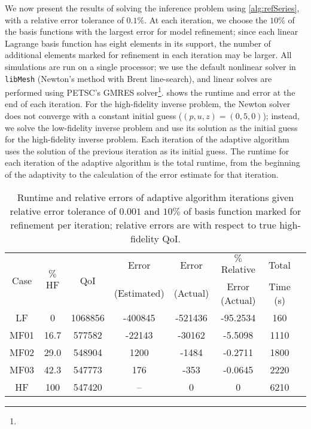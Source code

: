 We now present the results of solving the inference problem using \cref{alg:refSeries}, with a relative error tolerance of $0.1\%$. At each iteration, we choose the $10\%$ of the basis functions with the largest error for model refinement; since each linear Lagrange basis function has eight elements in its support, the number of additional elements marked for refinement in each iteration may be larger. All simulations are run on a single processor; we use the default nonlinear solver in \texttt{libMesh} (Newton's method with Brent line-search), and linear solves are performed using PETSC's GMRES solver\footnote{}.  shows the runtime and error at the end of each iteration. For the high-fidelity inverse problem, the Newton solver does not converge with a constant initial guess ($(p,u,z)=(0,5,0)$); instead, we solve the low-fidelity inverse problem and use its solution as the initial guess for the high-fidelity inverse problem. Each iteration of the adaptive algorithm uses the solution of the previous iteration as its initial guess. The runtime for each iteration of the adaptive algorithm is the total runtime, from the beginning of the adaptivity to the calculation of the error estimate for that iteration.
%
\begin{table}[htbp]
\caption{Runtime and relative errors of adaptive algorithm iterations given relative error tolerance of $0.001$ and $10\%$ of basis function marked for refinement per iteration; relative errors are with respect to true high-fidelity QoI.}
\label{tab:ref3D}
\centering
\begin{tabular}{|c|c|c|c|c|c|c|c|}
\hline
\multirow{2}{*}{Case} & \multirow{2}{*}{$\%$HF} & \multirow{2}{*}{QoI} & Error & Error & $\%$ Relative & Total \\ 
& & & (Estimated) & (Actual) & Error (Actual) & Time (s) \\ \hline
LF   & 0    & 1068856 & -400845 & -521436 & -95.2534 & 160 \\
MF01 & 16.7 & 577582  & -22143  & -30162  & -5.5098  & 1110 \\
MF02 & 29.0 & 548904  & 1200    & -1484   & -0.2711  & 1800 \\
MF03 & 42.3 & 547773  & 176     & -353    & -0.0645  & 2220 \\ %
HF   & 100  & 547420  & --      & 0       & 0        & 6210 \\ \hline
\end{tabular}
\end{table}
